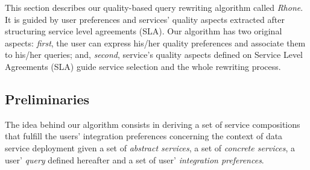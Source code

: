 This section describes our quality-based query rewriting algorithm called \textit{Rhone}. It is guided by user preferences and services' quality aspects extracted after structuring service level agreements (SLA). Our algorithm has two original aspects: \textit{first}, the user can express his/her quality preferences and associate them to his/her queries; and, \textit{second},  service's quality aspects defined on Service Level Agreements (SLA) guide service selection and  the whole rewriting process. %
%

\subsection{Preliminaries}

The idea behind our algorithm consists in deriving a set of service compositions that fulfill the users' integration preferences concerning the context of data service deployment given a set of \textit{abstract services}, a set of \textit{concrete services}, a user' \textit{query} defined hereafter and a set of user' \textit{integration preferences}.
%
%
